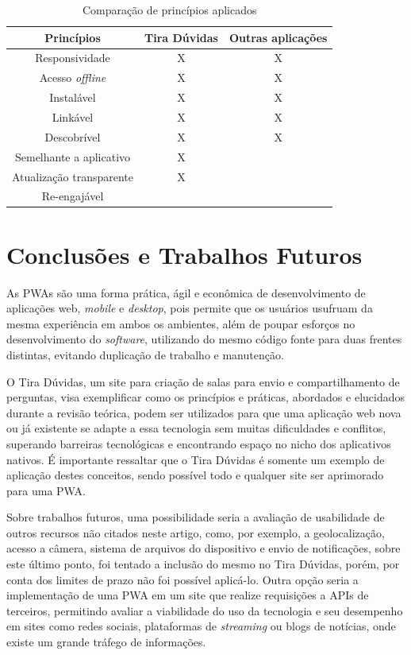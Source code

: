 \documentclass[12pt]{article}
\begin{document}
\begin{table}[h]        
    \centering
    \begin{tabular}{|c|c|c|}\hline
      Princípios   &  Tira Dúvidas & Outras aplicações \\ \hline
      Responsividade  & X & X \\ \hline
      Acesso \textit{offline} & X & X \\ \hline
      Instalável & X & X \\ \hline
      Linkável & X & X \\ \hline
      Descobrível & X & X \\ \hline
      Semelhante a aplicativo & X & \\ \hline
      Atualização transparente & X & \\ \hline
      Re-engajável & & \\ \hline
\end{tabular}
\caption{Comparação de princípios aplicados}
\label{fig:comparativo}
\end{table}

\section{Conclusões e Trabalhos Futuros} \label{sec:conclusoes}

As PWAs são uma forma prática, ágil e econômica de desenvolvimento de aplicações web, \textit{mobile} e \textit{desktop}, pois permite que os usuários usufruam da mesma experiência em ambos os ambientes, além de poupar esforços no desenvolvimento do \textit{software}, utilizando do mesmo código fonte para duas frentes distintas, evitando duplicação de trabalho e manutenção. 

O Tira Dúvidas, um site para criação de salas para envio e compartilhamento de perguntas, visa exemplificar como os princípios e práticas, abordados e elucidados durante a revisão teórica, podem ser utilizados para que uma aplicação web nova ou já existente se adapte a essa tecnologia sem muitas dificuldades e conflitos, superando barreiras tecnológicas e encontrando espaço no nicho dos aplicativos nativos. É importante ressaltar que o Tira Dúvidas é somente um exemplo de aplicação destes conceitos, sendo possível todo e qualquer site ser aprimorado para uma PWA.
  
Sobre trabalhos futuros, uma possibilidade seria a avaliação de usabilidade de outros recursos não 
citados neste artigo, como, por exemplo, a geolocalização, acesso a câmera, sistema de arquivos do dispositivo e envio de notificações, sobre este último ponto, foi tentado a inclusão do mesmo no Tira Dúvidas, porém, por conta dos limites de prazo não foi possível aplicá-lo. Outra opção seria a implementação de uma PWA em um site que realize requisições a APIs de terceiros, permitindo avaliar a viabilidade do uso da tecnologia e seu desempenho em sites como redes sociais, plataformas de \textit{streaming} ou blogs de notícias, onde existe um grande tráfego de informações.




\nocite{*}
\end{document}
